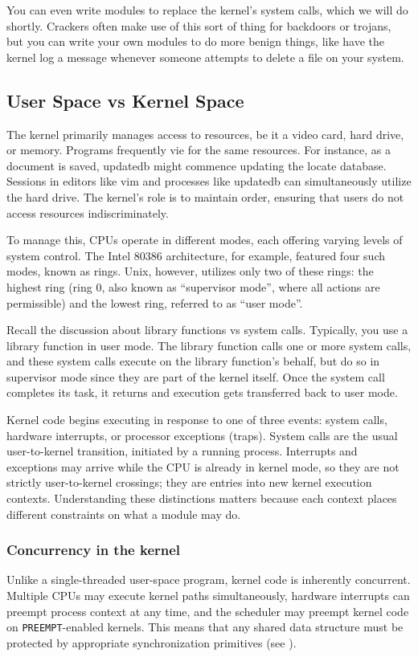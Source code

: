 \documentclass[10pt, oneside]{book}
\begin{document}
You can even write modules to replace the kernel's system calls, which we will do shortly.
Crackers often make use of this sort of thing for backdoors or trojans, but you can write your own modules to do more benign things, like have the kernel log a message whenever someone attempts to delete a file on your system.

\subsection{User Space vs Kernel Space}
\label{sec:user_kernl_space}
The kernel primarily manages access to resources, be it a video card, hard drive, or memory.
Programs frequently vie for the same resources.
For instance, as a document is saved, updatedb might commence updating the locate database.
Sessions in editors like vim and processes like updatedb can simultaneously utilize the hard drive.
The kernel's role is to maintain order, ensuring that users do not access resources indiscriminately.

To manage this, CPUs operate in different modes, each offering varying levels of system control.
The Intel 80386 architecture, for example, featured four such modes, known as rings.
Unix, however, utilizes only two of these rings: the highest ring (ring 0, also known as ``supervisor mode'',
where all actions are permissible) and the lowest ring, referred to as ``user mode''.

Recall the discussion about library functions vs system calls.
Typically, you use a library function in user mode.
The library function calls one or more system calls, and these system calls execute on the library function's behalf, but do so in supervisor mode since they are part of the kernel itself.
Once the system call completes its task, it returns and execution gets transferred back to user mode.

Kernel code begins executing in response to one of three events: system calls, hardware interrupts, or processor exceptions (traps).
System calls are the usual user-to-kernel transition, initiated by a running process.
Interrupts and exceptions may arrive while the CPU is already in kernel mode, so they are not strictly user-to-kernel crossings; they are entries into new kernel execution contexts.
Understanding these distinctions matters because each context places different constraints on what a module may do.

\subsubsection{Concurrency in the kernel}
\label{sec:kernel_concurrency}
Unlike a single-threaded user-space program, kernel code is inherently concurrent.
Multiple CPUs may execute kernel paths simultaneously, hardware interrupts can preempt process context at any time, and the scheduler may preempt kernel code on \verb|PREEMPT|-enabled kernels.
This means that any shared data structure must be protected by appropriate synchronization primitives (see ).
\end{document}
